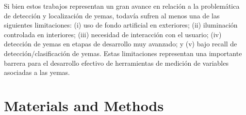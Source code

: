 \documentclass[a4paper,authoryear,review]{elsarticle}
\begin{document}
Si bien estos trabajos representan un gran avance en relación a la problemática de detección y localización de yemas, todavía sufren al menos una de las siguientes limitaciones: (i) uso de fondo artificial en exteriores; (ii) iluminación controlada en interiores; (iii) necesidad de interacción con el usuario; (iv) detección de yemas en etapas de desarrollo muy avanzado; y (v) bajo recall de detección/clasificación de yemas. Estas limitaciones representan una importante barrera para el desarrollo efectivo de herramientas de medición de variables asociadas a las yemas. 



\section{Materials and Methods}
\label{sec:matmet}
\end{document}
